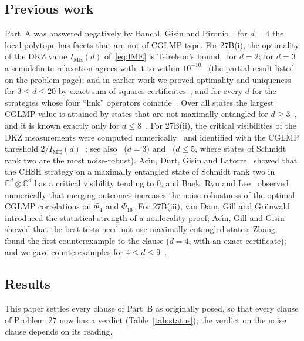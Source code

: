 \documentclass[11pt]{article}
\theoremstyle{remark}
\numberwithin{equation}{section}
\newcommand{\C}{\mathbb{C}}
\newcommand{\IME}{I_{\mathrm{ME}}}
\begin{document}
\subsection{Previous work}
Part~A was answered negatively by Bancal, Gisin and Pironio~\cite{BGP}: for $d=4$ the local polytope has facets that
are not of CGLMP type. For 27B(i), the optimality of the DKZ value $\IME(d)$ of~\eqref{eq:IME} is Tsirelson's
bound~\cite{Tsirelson} for $d=2$; for $d=3$ a semidefinite relaxation agrees with it to within $10^{-10}$~\cite{LVN}
(the partial result listed on the problem page); and in earlier work we proved optimality and uniqueness for
$3\le d\le20$ by exact sum-of-squares certificates~\cite{repoCGLMP}, and for every $d$ for the strategies whose four
``link'' operators coincide~\cite{MSclassical}. Over all states the largest CGLMP value is attained by states that are
not maximally entangled for $d\ge3$~\cite{ADGL}, and it is known exactly only for $d\le8$~\cite{IR,repoCGLMP}. For
27B(ii), the critical visibilities of the DKZ measurements were computed numerically~\cite{KGZMZ,DKZ} and identified
with the CGLMP threshold $2/\IME(d)$~\cite[eq.~(23)]{CGLMP}; see also~\cite{Chen01} ($d=3$) and~\cite{GLZ} ($d\le5$,
where states of Schmidt rank two are the most noise-robust). Ac\'{\i}n, Durt, Gisin and Latorre~\cite[eq.~(14)]{ADGL}
showed that the CHSH strategy on a maximally entangled state of Schmidt rank two in $\C^d\otimes\C^d$ has a critical
visibility tending to $0$, and Baek, Ryu and Lee~\cite{BRL} observed numerically that merging outcomes increases the
noise robustness of the optimal CGLMP correlations on $\Phi_4$ and $\Phi_{16}$. For 27B(iii), van Dam, Gill and
Gr\"unwald~\cite{vDGG} introduced the statistical strength of a nonlocality proof; Ac\'{\i}n, Gill and Gisin~\cite{AGG}
showed that the best tests need not use maximally entangled states; Zhang~\cite{Zhang} found the first counterexample to
the clause ($d=4$, with an exact certificate); and we gave counterexamples for $4\le d\le9$~\cite{repoCGLMP}.

\subsection{Results}
This paper settles every clause of Part~B as originally posed, so that every clause of Problem~27 now has a verdict
(Table~\ref{tab:status}); the verdict on the noise clause depends on its reading.
\end{document}

